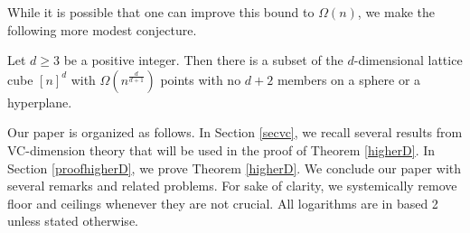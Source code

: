 %
%
While it is possible that one can improve this bound to $\Omega(n)$, we make the following more modest conjecture.
%
\begin{conjecture}\label{mainconj}
    Let $d \geq 3$ be a positive integer. Then there is a subset of the $d$-dimensional lattice cube $[n]^d$ with $\Omega(n^{\frac{d}{d + 1}})$ points with no $d+2$ members on a sphere or a hyperplane.
\end{conjecture}
%
%
%
%
Our paper is organized as follows.  In Section \ref{secvc}, we recall several results from VC-dimension theory that will be used in the proof of Theorem \ref{higherD}.  In Section \ref{proofhigherD}, we prove Theorem \ref{higherD}.   We conclude our paper with several remarks and related problems.  For sake of clarity, we systemically remove floor and ceilings whenever they are not crucial.  All logarithms are in based 2 unless stated otherwise.  
%
